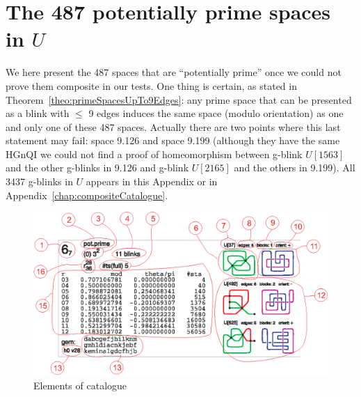 \chapter{The 487 potentially prime spaces in $U$}
\label{chap:primeCatalogue}

We here present the 487 spaces that are ``potentially prime'' once we could
not prove them composite in our tests. One thing is certain, as stated in
Theorem~\ref{theo:primeSpacesUpTo9Edges}: any prime space that can be
presented as a blink with $\leq$ 9 edges induces the same space (modulo
orientation) as one and only one of these 487 spaces. Actually there
are two points where this last statement may fail: space 9.126 and space 9.199 (although
they have the same HGnQI we could not find a proof of homeomorphism
between g-blink $U[1563]$ and the other g-blinks in 9.126 and g-blink $U[2165]$
and the others in 9.199). All 3437 g-blinks in $U$ appears in this Appendix or
in Appendix~\ref{chap:compositeCatalogue}.

\begin{figure}[htp]
   \begin{center}
      \leavevmode
      \includegraphics[width=12cm]{fig/catalogueExplanation.eps}
   \end{center}
   \vspace{-0.7cm}
   \caption{ Elements of catalogue}
   \label{fig:catalogueExplanation}
\end{figure}

